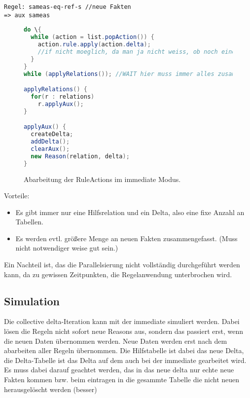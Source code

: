 \begin{verbatim}
Regel: sameas-eq-ref-s //neue Fakten
=> aux sameas
\end{verbatim}

\begin{figure}[htp]
	\caption{Abarbeitung der RuleActions im immediate Modus.}
	\label{code-immediate-delta-iteration}
	\begin{lstlisting}[language=Java]
do \{
  while (action = list.popAction()) {
    action.rule.apply(action.delta);
    //if nicht moeglich, da man ja nicht weiss, ob noch eine Regel entsteht (vllt schon moeglich aber aeusserst aufwendig)
  }
}
while (applyRelations()); //WAIT hier muss immer alles zusammenlaufen, jetzt koennen keine Regeln angewendet werden

applyRelations() {
  for(r : relations)
    r.applyAux();
}

applyAux() {
  createDelta;
  addDelta();
  clearAux();
  new Reason(relation, delta);
}
	\end{lstlisting}
\end{figure}

Vorteile:
\begin{itemize}
  \item Es gibt immer nur eine Hilfsrelation und ein Delta, also eine fixe Anzahl an Tabellen.
  \item Es werden evtl. größere Menge an neuen Fakten zusammengefasst. (Muss nicht notwendiger weise gut sein.)
\end{itemize}

Ein Nachteil ist, das die Parallelsierung nicht vollständig durchgeführt werden kann, da zu gewissen Zeitpunkten, die Regelanwendung unterbrochen wird.

\subsection{Simulation}

Die collective delta-Iteration kann mit der immediate simuliert werden. Dabei lösen die Regeln nicht sofort neue Reasons aus, sondern das passiert erst, wenn die neuen Daten übernommen werden. Neue Daten werden erst nach dem abarbeiten aller Regeln übernommen. Die Hilfstabelle ist dabei das neue Delta, die Delta-Tabelle ist das Delta auf dem auch bei der immediate gearbeitet wird. Es muss dabei darauf geachtet werden, das in das neue delta nur echte neue Fakten kommen bzw. beim eintragen in die gesammte Tabelle die nicht neuen herausgelöscht werden (besser)


